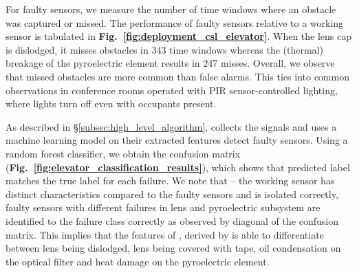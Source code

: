 \newcommand{\elevatortable}{%
		\footnotesize
		\centering
		\begin{tabular}{ | l | c | c | }
			\hline
			\multirow{2}{*}{\bfseries \textsc{Fault Present}} & 
			\multicolumn{2}{c|}{\bfseries WIN = 2432} \\
			\cline{2-3}
			& \bfseries MO &  \bfseries FD \\ \hline \hline
			Lens Dislodged &  343 & 50   \\ \hline
			Lens Covered with Black Tape &  529 & 0   \\ \hline
			Pyroelectric Element Heat Damage &  247 &  55 \\ \hline
			Optical Filter Covered & 526 & 0  \\ \hline
			Sensor Board Short & 529 & 0 \\ \hline
		\end{tabular}			
}




For faulty sensors, we measure the number of time windows where an obstacle was captured or missed. 
The performance of faulty sensors relative to a working sensor is tabulated in {\bfseries Fig.~\ref{fig:deployment_csl_elevator}}. 
When the lens cap is dislodged, it misses obstacles in 343 time windows whereas the (thermal) breakage of the pyroelectric element results in 247 misses. 
Overall, we observe that missed obstacles are more common than false alarms.
This ties into common observations in conference rooms operated with PIR sensor-controlled lighting, where lights turn off even with occupants present.


As described in \S\ref{subsec:high_level_algorithm}, \sol collects the \aout signals and uses a machine learning model on their extracted features detect faulty sensors. %
Using a random forest classifier, we obtain the confusion matrix ({\bfseries Fig.~\ref{fig:elevator_classification_results}}), which shows that predicted label matches the true label for each failure. 
We note that -- \ca the working sensor has distinct characteristics compared to the faulty sensors and is isolated correctly, \cb faulty sensors with different failures in lens and pyroelectric subsystem are identified to the failure class correctly as observed by diagonal of the confusion matrix. This implies that the %
features of \aout, derived by \sol is able to differentiate between lens being dislodged, lens being covered with tape, oil condensation on the optical filter and heat damage on the pyroelectric element.



